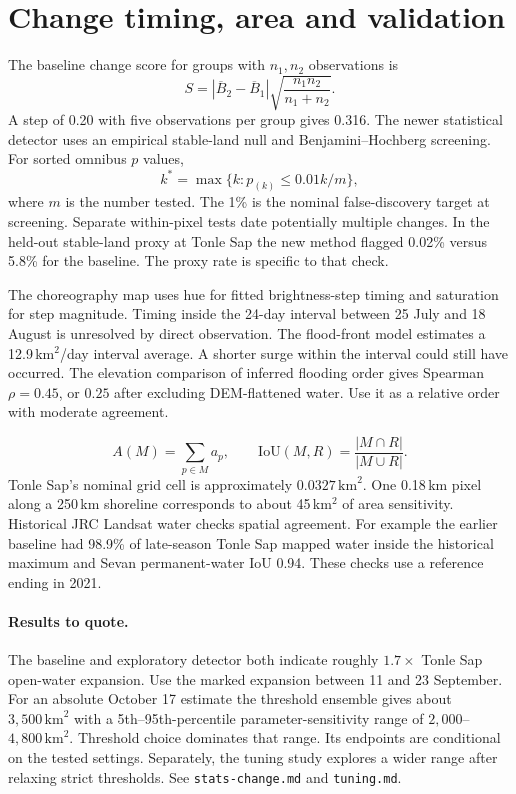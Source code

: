 \documentclass[11pt]{article}
\begin{document}
\section{Change timing, area and validation}
The baseline change score for groups with $n_1,n_2$ observations is
\[
 S=|\overline B_2-\overline B_1|\sqrt{\frac{n_1 n_2}{n_1+n_2}}.
\]
A step of 0.20 with five observations per group gives 0.316.
The newer statistical detector uses an empirical stable-land null and
Benjamini--Hochberg screening. For sorted omnibus $p$ values,
\[
 k^*=\max\{k:p_{(k)}\le 0.01k/m\},
\]
where $m$ is the number tested. The 1\% is the nominal false-discovery
target at screening. Separate within-pixel tests date potentially
multiple changes. In the held-out stable-land proxy at Tonle Sap
the new method flagged 0.02\% versus 5.8\% for the baseline.
The proxy rate is specific to that check.

The choreography map uses hue for fitted brightness-step timing
and saturation for step magnitude. Timing inside the 24-day interval
between 25 July and 18 August is unresolved by direct observation.
The flood-front model estimates a 12.9\,km$^2$/day interval average.
A shorter surge within the interval could still have occurred.
The elevation comparison of inferred flooding order gives Spearman
$\rho=0.45$, or $0.25$ after excluding DEM-flattened water.
Use it as a relative order with moderate agreement.

\[
 A(M)=\sum_{p\in M} a_p,\qquad
 \mathrm{IoU}(M,R)=\frac{|M\cap R|}{|M\cup R|}.
\]
Tonle Sap's nominal grid cell is approximately $0.0327\,\mathrm{km}^2$.
One 0.18\,km pixel along a 250\,km shoreline corresponds to about
45\,km$^2$ of area sensitivity. Historical JRC Landsat water checks
spatial agreement. For example the earlier baseline had 98.9\%
of late-season Tonle Sap mapped water inside the historical maximum
and Sevan permanent-water IoU 0.94. These checks use a reference
ending in 2021.

\paragraph{Results to quote.}
The baseline and exploratory detector both indicate roughly
$1.7\times$ Tonle Sap open-water expansion. Use the marked expansion
between 11 and 23 September. For an absolute October 17 estimate the
threshold ensemble gives about $3{,}500\,\mathrm{km}^2$ with
a 5th--95th-percentile parameter-sensitivity range of
$2{,}000$--$4{,}800\,\mathrm{km}^2$. Threshold choice dominates
that range. Its endpoints are conditional on the tested settings.
Separately, the tuning study explores a wider range after relaxing
strict thresholds. See \texttt{stats-change.md} and \texttt{tuning.md}.
\end{document}
